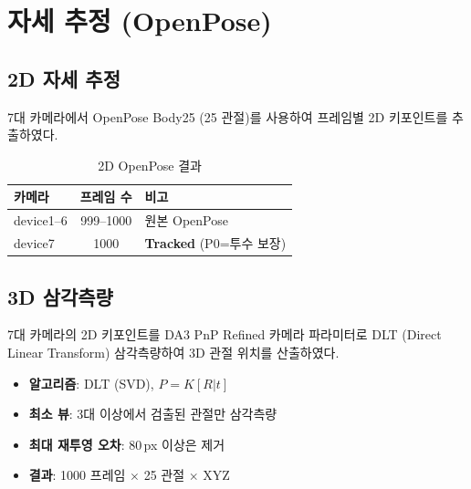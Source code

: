\documentclass[11pt, a4paper]{report}
\begin{document}
\chapter{자세 추정 (OpenPose)}

\section{2D 자세 추정}

7대 카메라에서 OpenPose Body25 (25 관절)를 사용하여 프레임별 2D 키포인트를 추출하였다.

\begin{table}[H]
\centering
\caption{2D OpenPose 결과}
\renewcommand{\arraystretch}{1.3}
\begin{tabular}{lcl}
\toprule
\textbf{카메라} & \textbf{프레임 수} & \textbf{비고} \\
\midrule
device1--6 & 999--1000 & 원본 OpenPose \\
device7 & 1000 & \textbf{Tracked} (P0=투수 보장) \\
\bottomrule
\end{tabular}
\end{table}


\section{3D 삼각측량}

\begin{cvbox}[title={DLT 삼각측량}]
7대 카메라의 2D 키포인트를 DA3 PnP Refined 카메라 파라미터로
DLT (Direct Linear Transform) 삼각측량하여 3D 관절 위치를 산출하였다.
\begin{itemize}[nosep]
  \item \textbf{알고리즘}: DLT (SVD), $P = K[R|t]$
  \item \textbf{최소 뷰}: 3대 이상에서 검출된 관절만 삼각측량
  \item \textbf{최대 재투영 오차}: 80\,px 이상은 제거
  \item \textbf{결과}: 1000 프레임 $\times$ 25 관절 $\times$ XYZ
\end{itemize}
\end{cvbox}
\end{document}
